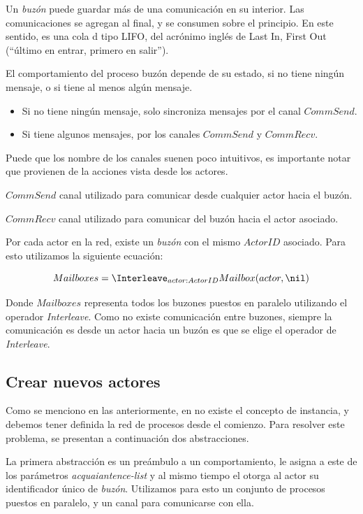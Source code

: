 Un \textit{buzón} puede guardar más de una comunicación en su interior. Las comunicaciones se agregan al final, y se consumen sobre el principio. En este sentido, es una cola d tipo LIFO, del acrónimo inglés de Last In, First Out (``último en entrar, primero en salir'').

El comportamiento del proceso buzón depende de su estado, si no tiene ningún mensaje, o si tiene al menos algún mensaje. 

\begin{itemize}
\item Si no tiene ningún mensaje, solo sincroniza mensajes por el canal $CommSend$.
\item Si tiene algunos mensajes, por los canales $CommSend$ y $CommRecv$.
\end{itemize}

Puede que los nombre de los canales suenen poco intuitivos, es importante notar que provienen de la acciones vista desde los actores.

\begin{description}
\item $CommSend$ canal utilizado para comunicar desde cualquier actor hacia el buzón.
\item $CommRecv$ canal utilizado para comunicar del buzón hacia el actor asociado.
\end{description}

Por cada actor en la red, existe un \textit{buzón} con el mismo $ActorID$ asociado. Para esto utilizamos la siguiente ecuación:

\[
Mailboxes = \Interleave_{ actor : ActorID } Mailbox(actor, \nil) 
\]

Donde $Mailboxes$ representa todos los buzones puestos en paralelo utilizando el operador \textit{Interleave}. Como no existe comunicación entre buzones, siempre la comunicación es desde un actor hacia un buzón es que se elige el operador de \textit{Interleave}.

\subsection{Crear nuevos actores}

Como se menciono en las anteriormente, en \CSP no existe el concepto de instancia, y debemos tener definida la red de procesos desde el comienzo. Para resolver este problema, se presentan a continuación dos abstracciones.

La primera abstracción es un preámbulo a un comportamiento, le asigna a este de los parámetros \textit{acquaiantence-list} y al mismo tiempo el otorga al actor su identificador único de \textit{buzón}. Utilizamos para esto un conjunto de procesos puestos en paralelo, y un canal para comunicarse con ella.

